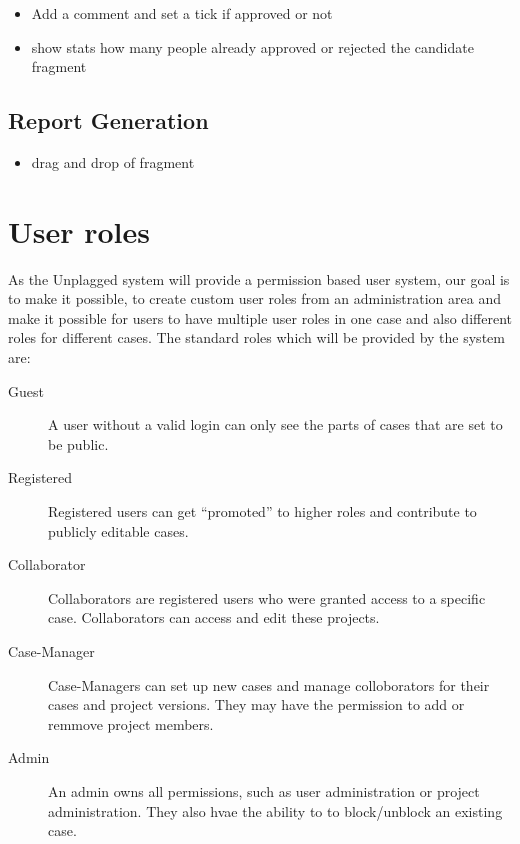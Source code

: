 \begin{itemize}
\item Add a comment and set a tick if approved or not
\item show stats how many people already approved or rejected the candidate fragment
\end{itemize}

\subsection{Report Generation}
\begin{itemize}
\item  drag and drop of fragment
\end{itemize}

\section{User roles}

As the Unplagged system will provide a permission based user system, our goal is to make it possible, to create custom 
user roles from an administration area and make it possible for users to have multiple user roles in one case and also different roles for different cases.
The standard roles which will be provided by the system are:

\begin{description}
\item[Guest]
A user without a valid login can only see the parts of cases that are set to be public.
\item[Registered]
Registered users can get \enquote{promoted} to higher roles and contribute to publicly editable cases.
\item[Collaborator]
Collaborators are registered users who were granted access to a specific case. Collaborators can access and edit these projects.
\item[Case-Manager]
Case-Managers can set up new cases and manage colloborators for their cases and project versions. They may have the permission to add or remmove project members.
\item[Admin]
An admin owns all permissions, such as user administration or project administration. They also hvae the ability to to block/unblock an existing case.
\end{description}

